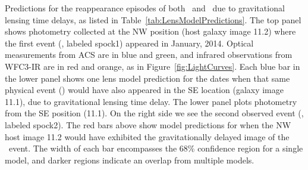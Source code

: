 \label{fig:SpockDelayPredictions}
Predictions for the reappearance episodes of both \spockone\
and \spocktwo\, due to gravitational lensing time delays, as listed in
Table~\ref{tab:LensModelPredictions}.  The top panel shows photometry
collected at the NW position (host galaxy image 11.2) where the first
event (\spockone, labeled spock1) appeared in January, 2014.  Optical
measurements from ACS are in blue and green, and infrared observations
from WFC3-IR are in red and orange, as in
Figure~\ref{fig:LightCurves}.  Each blue bar in the lower panel shows
one lens model prediction for the dates when that same physical event
(\spockone) would have also appeared in the SE location (galaxy image
11.1), due to gravitational lensing time delay.  The lower panel plots
photometry from the SE position (11.1). On the right side we see the
second observed event (\spocktwo, labeled spock2).  The red bars above
show model predictions for when the NW host image 11.2 would have
exhibited the gravitationally delayed image of the \spocktwo\ event.
The width of each bar encompasses the 68\% confidence region for a
single model, and darker regions indicate an overlap from multiple
models.
  
